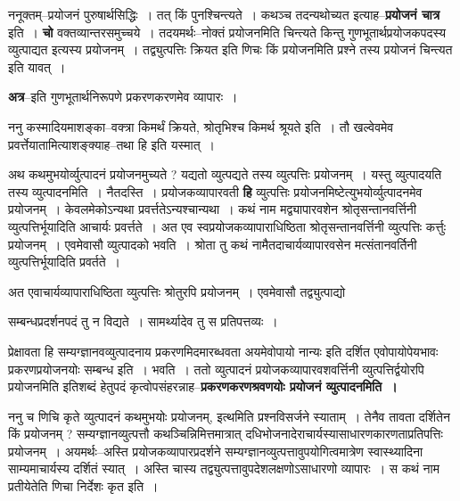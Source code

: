 \documentclass[article,12pt,a4paper]{memoir}
\begin{document}
	  \pstart ननूक्तम्--प्रयोजनं पुरुषार्थसिद्धिः । तत् किं पुनश्चिन्त्यते । कथञ्च तदन्यथोच्यत इत्याह--\textbf{प्रयोजनं चात्र} इति । \textbf{चो} वक्तव्यान्तरसमुच्चये । तदयमर्थः--नोक्तं प्रयोजनमिति चिन्त्यते किन्तु गुणभूतार्थप्रयोजकपदस्य व्युत्पाद्यत इत्यस्य प्रयोजनम् । तद्व्युत्पत्तिः क्रियत इति णिचः किं प्रयोजनमिति प्रश्ने तस्य प्रयोजनं चिन्त्यत इति यावत् ।
	\pend
      

	  \pstart \textbf{अत्र}--इति गुणभूतार्थनिरूपणे प्रकरणकरणमेव व्यापारः ।
	\pend
      

	  \pstart ननु कस्मादियमाशङ्का--वक्त्रा किमर्थं क्रियते, श्रोतृभिश्च किमर्थ श्रूयते इति । तौ खल्वेवमेव प्रवर्त्तेयातामित्याशङ्क्याह--तथा हि इति यस्मात् ।
	\pend
      

	  \pstart अथ कथमुभयोर्व्युत्पादनं प्रयोजनमुच्यते ? यद्यतो व्युत्पद्यते तस्य व्युत्पत्तिः प्रयोजनम् । यस्तु व्युत्पादयति तस्य व्युत्पादनमिति । नैतदस्ति । प्रयोजकव्यापारवती \textbf{हि} व्युत्पत्तिः प्रयोजनमिष्टेत्युभयोर्व्युत्पादनमेव प्रयोजनम् । केवलमेकोऽन्यथा प्रवर्त्ततेऽन्यश्चान्यथा । कथं नाम मद्व्यापारवशेन श्रोतृसन्तानवर्त्तिनी व्युत्पत्तिर्भूयादिति आचार्यः प्रवर्त्तते । अत एव स्वप्रयोजकव्यापाराधिष्ठिता श्रोतृसन्तानवर्त्तिनी व्युत्पत्तिः कर्त्तुः प्रयोजनम् । एवमेवासौ व्युत्पादको भवति । श्रोता तु कथं नामैतदाचार्यव्यापारवसेन मत्संतानवर्तिनी व्युत्पत्तिर्भूयादिति प्रवर्तते ।
	\pend
      

	  \pstart अत एवाचार्यव्यापाराधिष्ठिता व्युत्पत्तिः श्रोतुरपि प्रयोजनम् । एवमेवासौ तद्व्युत्पाद्यो  \leavevmode{} 
	  
	सम्बन्धप्रदर्शनपदं तु न विद्यते । सामर्थ्यादेव तु स प्रतिपत्तव्यः ।  
	  
	प्रेक्षावता हि सम्यग्ज्ञानवव्युत्पादनाय प्रकरणमिदमारब्धवता अयमेवोपायो नान्यः इति दर्शित एवोपायोपेयभावः प्रकरणप्रयोजनयोः सम्बन्ध इति । भवति । ततो व्युत्पादनं प्रयोजकव्यापारवशवर्त्तिनी व्युत्पत्तिर्द्वयोरपि प्रयोजनमिति इतिशब्दं हेतुपदं कृत्वोपसंहरन्नाह--\textbf{प्रकरणकरणश्रवणयोः प्रयोजनं व्युत्पादनमिति ।}
	\pend
      

	  \pstart ननु च णिचि कृते व्युत्पादनं कथमुभयोः प्रयोजनम्, इत्थमिति \leavevmode{} प्रश्नविसर्जने स्याताम् । तेनैव तावता दर्शितेन किं प्रयोजनम् ? सम्यग्ज्ञानव्युत्पत्तौ कथञ्चिन्निमित्तमात्रात् दधिभोजनादेराचार्यस्यासाधारणकारणताप्रतिपत्तिः प्रयोजनम् । अयमर्थः--अस्ति प्रयोजकव्यापारप्रदर्शने सम्यग्ज्ञानव्युत्पत्तावुपयोगित्वमात्रेण स्वास्थ्यादिना साम्यमाचार्यस्य दर्शितं स्यात् । अस्ति चास्य तद्व्युत्पत्तावुपदेशलक्षणोऽसाधारणो व्यापारः । स कथं नाम प्रतीयेतेति णिचा निर्देशः कृत इति ।
	\pend
      
\end{document}

